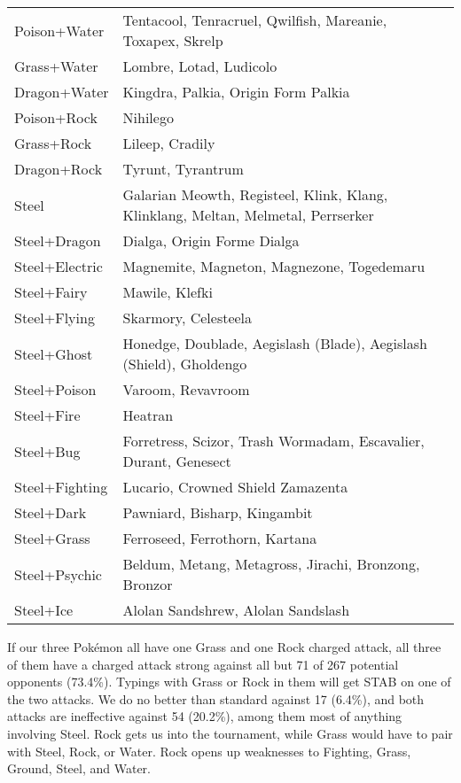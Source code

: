 \begin{table}
\begin{tabular}{lp{.7\linewidth}}
Poison+Water & Tentacool, Tenracruel, Qwilfish, Mareanie, Toxapex, Skrelp\\
Grass+Water & Lombre, Lotad, Ludicolo\\
Dragon+Water & Kingdra, Palkia, Origin Form Palkia\\
Poison+Rock & Nihilego\\
Grass+Rock & Lileep, Cradily\\
Dragon+Rock & Tyrunt, Tyrantrum\\
Steel & Galarian Meowth, Registeel, Klink, Klang, Klinklang, Meltan, Melmetal, Perrserker\\
Steel+Dragon & Dialga, Origin Forme Dialga\\
Steel+Electric & Magnemite, Magneton, Magnezone, Togedemaru \\
Steel+Fairy & Mawile, Klefki\\
Steel+Flying & Skarmory, Celesteela \\
Steel+Ghost & Honedge, Doublade, Aegislash (Blade), Aegislash (Shield), Gholdengo\\
Steel+Poison & Varoom, Revavroom\\
Steel+Fire & Heatran\\
Steel+Bug & Forretress, Scizor, Trash Wormadam, Escavalier, Durant, Genesect\\
Steel+Fighting & Lucario, Crowned Shield Zamazenta\\
Steel+Dark & Pawniard, Bisharp, Kingambit\\
Steel+Grass & Ferroseed, Ferrothorn, Kartana\\
Steel+Psychic & Beldum, Metang, Metagross, Jirachi, Bronzong, Bronzor\\
Steel+Ice & Alolan Sandshrew, Alolan Sandslash\\
\end{tabular}
\end{table}

If our three Pokémon all have one Grass and one Rock charged attack,
  all three of them have a charged attack strong against all but
  71 of 267 potential opponents (73.4\%).
Typings with Grass or Rock in them will get STAB on one of the two attacks.
We do no better than standard against 17 (6.4\%), and both attacks are
  ineffective against 54 (20.2\%), among them most of anything involving
  Steel.
Rock gets us into the tournament, while Grass would have to pair with Steel,
  Rock, or Water.
Rock opens up weaknesses to Fighting, Grass, Ground, Steel, and Water.

